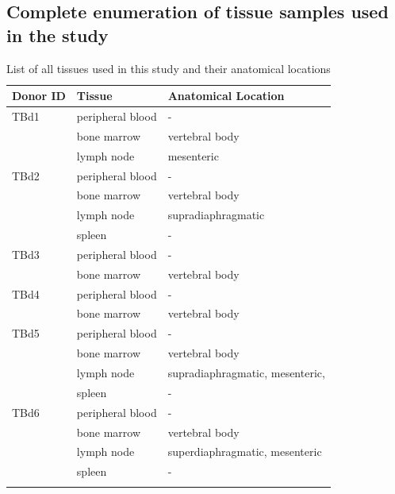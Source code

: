 \subsection{Complete enumeration of tissue samples used in the study}
\begin{longtable}{lll}
\midrule
Donor ID &  Tissue  &              Anatomical Location \\
\midrule
    TBd1 & peripheral blood &                                - \\
         &      bone marrow &                   vertebral body \\
         &       lymph node &                       mesenteric \\
    TBd2 & peripheral blood &                                - \\
         &      bone marrow &                   vertebral body \\
         &       lymph node &               supradiaphragmatic \\
         &           spleen &                                - \\
    TBd3 & peripheral blood &                                - \\
         &      bone marrow &                   vertebral body \\
    TBd4 & peripheral blood &                                - \\
         &      bone marrow &                   vertebral body \\
    TBd5 & peripheral blood &                                - \\
         &      bone marrow &                   vertebral body \\
         &       lymph node & supradiaphragmatic, mesenteric,  \\
         &           spleen &                                - \\
    TBd6 & peripheral blood &                                - \\
         &      bone marrow &                   vertebral body \\
         &       lymph node &   superdiaphragmatic, mesenteric \\
         &           spleen &                                - \\         
\bottomrule
\bottomrule
\caption{List of all tissues used in this study and their anatomical locations}{}
\label{tab:tissue-list}
\end{longtable}
